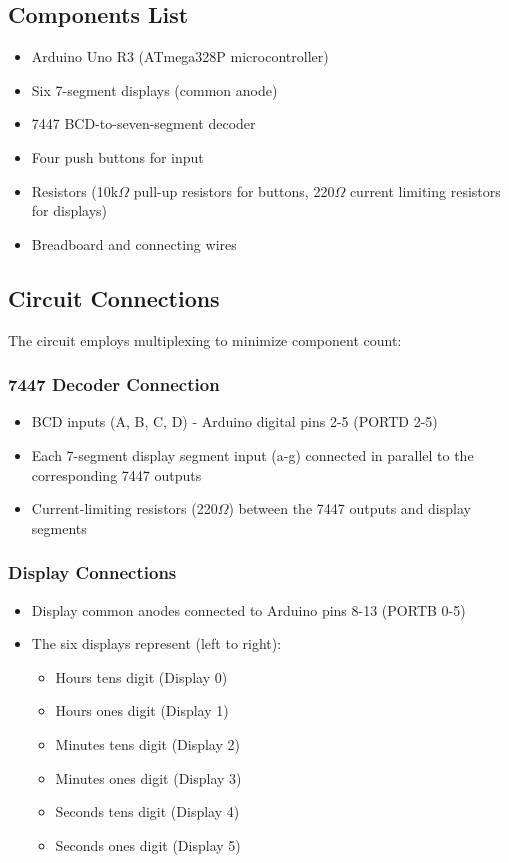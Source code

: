 \documentclass[12pt,a4paper]{article}
\begin{document}
\subsection{Components List}

\begin{itemize}
    \item Arduino Uno R3 (ATmega328P microcontroller)
    \item Six 7-segment displays (common anode)
    \item 7447 BCD-to-seven-segment decoder
    \item Four push buttons for input
    \item Resistors (10k$\Omega$ pull-up resistors for buttons, 220$\Omega$ current limiting resistors for displays)
    \item Breadboard and connecting wires
\end{itemize}

\subsection{Circuit Connections}

The circuit employs multiplexing to minimize component count:

\subsubsection{7447 Decoder Connection}
\begin{itemize}
    \item BCD inputs (A, B, C, D) - Arduino digital pins 2-5 (PORTD 2-5)
    \item Each 7-segment display segment input (a-g) connected in parallel to the corresponding 7447 outputs
    \item Current-limiting resistors (220$\Omega$) between the 7447 outputs and display segments
\end{itemize}

\subsubsection{Display Connections}
\begin{itemize}
    \item Display common anodes connected to Arduino pins 8-13 (PORTB 0-5)
    \item The six displays represent (left to right):
    \begin{itemize}
        \item Hours tens digit (Display 0)
        \item Hours ones digit (Display 1)
        \item Minutes tens digit (Display 2)
        \item Minutes ones digit (Display 3)
        \item Seconds tens digit (Display 4)
        \item Seconds ones digit (Display 5)
    \end{itemize}
\end{itemize}
\end{document}

